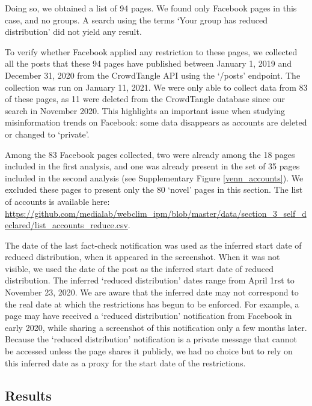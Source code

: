 \documentclass[review]{elsarticle}
\begin{document}
{{Doing so, we obtained a list of 94 pages. 
We found only Facebook pages in this case, and no groups. 
A search using the terms `Your group has reduced distribution' did not yield any result.

To verify whether Facebook applied any restriction to these pages, we collected all the posts that these 94 pages have published between January 1, 2019 and December 31, 2020 from the CrowdTangle API using the `/posts' endpoint. 
The collection was run on January 11, 2021.
We were only able to collect data from 83 of these pages, as 11 were deleted from the CrowdTangle database since our search in November 2020. 
This highlights an important issue when studying misinformation trends on Facebook: some data disappears as accounts are deleted or changed to ‘private’.

Among the 83 Facebook pages collected, two were already among the 18 pages included in the first analysis, and one was already present in the set of 35 pages included in the second analysis (see Supplementary Figure \ref{venn_accounts}).
We excluded these pages to present only the 80 `novel' pages in this section.
The list of accounts is available here: \url{https://github.com/medialab/webclim_ipm/blob/master/data/section_3_self_declared/list_accounts_reduce.csv}.

The date of the last fact-check notification was used as the inferred start date of reduced distribution, when it appeared in the screenshot. 
When it was not visible, we used the date of the post as the inferred start date of reduced distribution.
The inferred `reduced distribution' dates range from April 1rst to November 23, 2020.
We are aware that the inferred date may not correspond to the real date at which the restrictions has begun to be enforced.
For example, a page may have received a `reduced distribution' notification from Facebook in early 2020, while sharing a screenshot of this notification only a few months later.
Because the `reduced distribution' notification is a private message that cannot be accessed unless the page shares it publicly, we had no choice but to rely on this inferred date as a proxy for the start date of the restrictions.

\subsection{Results}

}}
\end{document}
